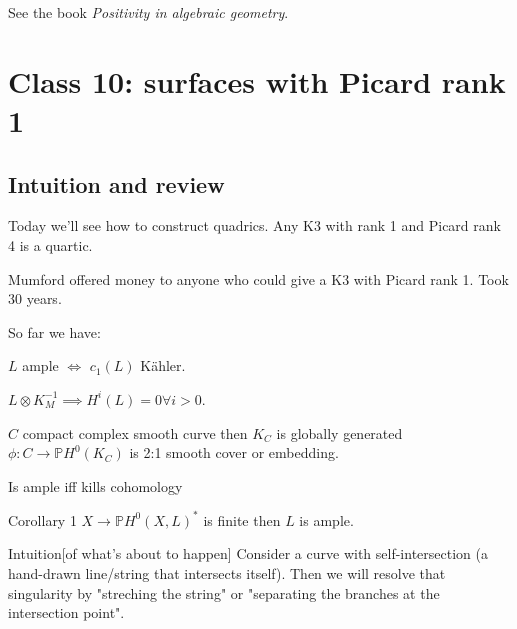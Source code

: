 \begin{remark}
	See the book \textit{Positivity in algebraic geometry}.
\end{remark}




\section{Class 10: surfaces with Picard rank 1}

\subsection{Intuition and review}

Today we'll see how to construct quadrics. Any K3 with rank 1 and Picard rank 4 is a quartic.

\begin{idea4}{Mumford}\leavevmode
	offered money to anyone who could give a K3 with Picard rank 1. Took 30 years.
\end{idea4}

So far we have:

\begin{thm}[Kodaira]\leavevmode
	$L$ ample $\iff$ $c_1(L)$ Kähler.
\end{thm}

\begin{thm}\leavevmode
	$L\otimes K^{-1}_M\implies H^{i}(L)=0\forall i>0$.
\end{thm}

\begin{thm}[?]\leavevmode
	$C$ compact complex smooth curve then $K_C$ is globally generated  $\phi:C\longrightarrow \mathbb{P}H^{0}(K_C)$ is 2:1 smooth cover or embedding.
\end{thm}

\begin{thm}\leavevmode
	Is ample iff kills cohomology
\end{thm}

\begin{idea2}{Corollary 1}\leavevmode
	$X\longrightarrow \mathbb{P}H^{0}(X,L)^*$ is finite then $L$ is ample.
\end{idea2}

\begin{idea5}{Intuition}[of what's about to happen]\leavevmode
	Consider a curve with self-intersection (a hand-drawn line/string that intersects itself). Then we will resolve that singularity by "streching the string" or "separating the branches at the intersection point".
\end{idea5}

